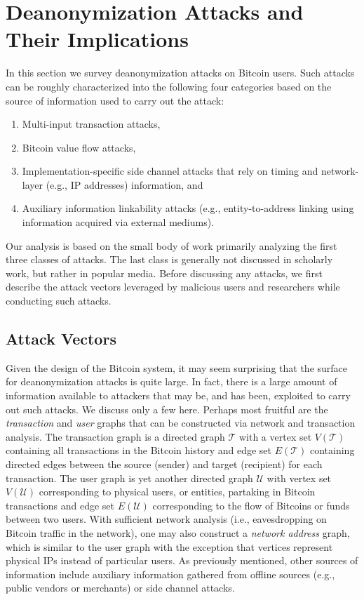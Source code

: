 \section{Deanonymization Attacks and Their Implications} \label{sec:attacks}
In this section we survey deanonymization attacks on Bitcoin users. Such attacks can be roughly characterized into the following four categories based on the source of information used to carry out the attack:
\begin{enumerate}
	\item Multi-input transaction attacks,
	\item Bitcoin value flow attacks,
	\item Implementation-specific side channel attacks that rely on timing and network-layer (e.g., IP addresses) information, and
	\item Auxiliary information linkability attacks (e.g., entity-to-address linking using information acquired via external mediums).
\end{enumerate}
Our analysis is based on the small body of work primarily analyzing the first three classes of attacks. The last class is generally not discussed in scholarly work, but rather in popular media. Before discussing any attacks, we first describe the attack vectors leveraged by malicious users and researchers while conducting such attacks.

\subsection{Attack Vectors} \label{sec:vectors}
Given the design of the Bitcoin system, it may seem surprising that the surface for deanonymization attacks is quite large. In fact, there is a large amount of information available to attackers that may be, and has been, exploited to carry out such attacks. We discuss only a few here. Perhaps most fruitful are the \emph{transaction} and \emph{user} graphs that can be constructed via network and transaction analysis. The transaction graph is a directed graph $\mathcal{T}$ with a vertex set $V(\mathcal{T})$ containing all transactions in the Bitcoin history and edge set $E(\mathcal{T})$ containing directed edges between the source (sender) and target (recipient) for each transaction. The user graph is yet another directed graph $\mathcal{U}$ with vertex set $V(\mathcal{U})$ corresponding to physical users, or entities, partaking in Bitcoin transactions and edge set $E(\mathcal{U})$ corresponding to the flow of Bitcoins or funds between two users. With sufficient network analysis (i.e., eavesdropping on Bitcoin traffic in the network), one may also construct a \emph{network address} graph, which is similar to the user graph with the exception that vertices represent physical IPs instead of particular users. As previously mentioned, other sources of information include auxiliary information gathered from offline sources (e.g., public vendors or merchants) or side channel attacks.

